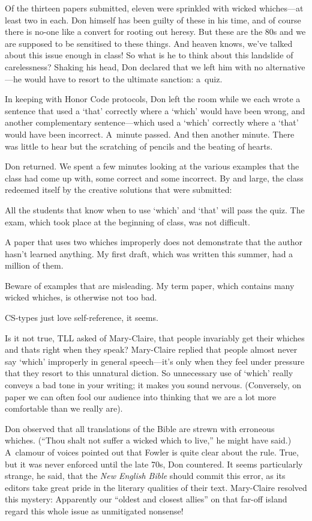 Of the thirteen papers submitted, eleven were sprinkled with wicked
whiches---at least two in each. Don himself has been guilty of
these in his time, and of course there is no-one like a convert for
rooting out heresy.
  But these are the 80s and we are supposed to be sensitised
to these things. And heaven knows, we've talked about this issue enough
in class!  So what is he to think about this landslide of
carelessness?  Shaking his head, Don declared that we left him with no
alternative---he would have to resort to the ultimate sanction: 
a~quiz. 

In keeping with Honor Code protocols, Don left the room while we
each wrote a sentence that used a `that' correctly where a `which'
would have been wrong, and another complementary
sentence---which used a `which'
correctly where a `that' would have been incorrect. A~minute passed.
And then another minute.  
 There was little to hear but the scratching of pencils
and the beating of hearts. 

Don returned. We spent a few minutes
looking at the various examples that the class had come up with, some
correct and some incorrect.  
By and large, the class redeemed itself by the creative solutions
that were submitted:

{\narrower\smallskip\noindent
All the students that know when to use `which' and `that' will pass the
quiz. The exam, which took place at the beginning of class, was not
difficult. 

A paper that uses two whiches improperly does not demonstrate that
the author hasn't learned anything. My first draft, which was written
this summer, had a million of them.

Beware of examples that are misleading. My term paper, which contains
many wicked whiches, is otherwise not too bad.
\smallskip}

CS-types
just love self-reference, it seems. 

Is it not true, TLL asked of
Mary-Claire, that people invariably get their whiches and thats
right when they speak?  Mary-Claire replied that people 
almost never say `which' improperly
 in general speech---it's only when they
feel under pressure that they resort to this unnatural diction.  So
unnecessary use of `which' really conveys a bad tone in your writing;
it makes you sound nervous.  (Conversely, on paper we can often fool
our audience into thinking that we are a lot more comfortable than we
really are).

Don observed that all translations of the Bible are strewn with
erroneous whiches. (``Thou shalt not suffer a wicked which to live,''
he might have said.) A~clamour of voices pointed out that Fowler is
quite clear about the rule. True, but it was never enforced until the
late 70s, Don countered. It seems particularly strange, he said, that
the {\sl New English Bible\/} should commit this error, as its editors
take great pride in the literary qualities of their text. Mary-Claire
resolved this mystery: Apparently our ``oldest and closest allies''
on that far-off island
regard this whole issue as unmitigated nonsense!

